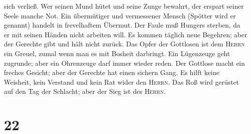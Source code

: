 sich verließ.  Wer seinen Mund hütet und seine Zunge
bewahrt, der erspart seiner Seele manche Not.  Ein
übermütiger und vermessener Mensch (Spötter wird er genannt) handelt in
frevelhaftem Übermut.  Der Faule muß Hungers sterben, da
er mit seinen Händen nicht arbeiten will.  Es kommen
täglich neue Begehren; aber der Gerechte gibt und hält nicht zurück.
 Das Opfer der Gottlosen ist dem \textsc{Herrn} ein
Greuel, zumal wenn man es mit Bosheit darbringt.  Ein
Lügenzeuge geht zugrunde; aber ein Ohrenzeuge darf immer wieder reden.
 Der Gottlose macht ein freches Gesicht; aber der
Gerechte hat einen sichern Gang.  Es hilft keine
Weisheit, kein Verstand und kein Rat wider den \textsc{Herrn}.
 Das Roß wird gerüstet auf den Tag der Schlacht; aber der
Sieg ist des \textsc{Herrn}.

\hypertarget{section-21}{%
\section{22}\label{section-21}}

